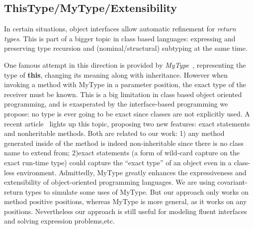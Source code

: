 % 

\subsection{ThisType/MyType/Extensibility}

In certain situations, object interfaces allow automatic refinement for \emph{return
types}. This is part of a bigger topic in class based languages: expressing and
preserving type recursion and (nominal/structural) subtyping at the same time.

One famous attempt in this direction is provided by
\emph{MyType}~\cite{bruce1994paradigmatic}, representing the type of
\textbf{this}, changing its meaning along with inheritance. However when
invoking a method with MyType in a parameter position, the exact type of the
receiver must be known.  This is a big limitation in class based object oriented
programming, and is exasperated by the interface-based programming we propose: no
type is ever going to be exact since classes are not explicitly used. A recent
article~\cite{Saito2013933} lights up this topic, proposing two
new features: exact statements and nonheritable methods. Both are
related to our work: 1) any method generated inside of the \Q@of@ method is indeed
non-inheritable since there is no class name to extend from; 2)exact
statements (a form of wild-card capture on the exact run-time type) could
capture the ``exact type'' of an object even in a class-less
environment. 
Admittedly, MyType greatly enhances the expressiveness and extensibility of
object-oriented programming languages. We are using covariant-return types to
simulate some uses of MyType. But our approach only works on method positive
positions, whereas MyType is more general, as it works on any
positions. Nevertheless our approach is still useful for modeling fluent
interfaces and solving expression problems,etc.



